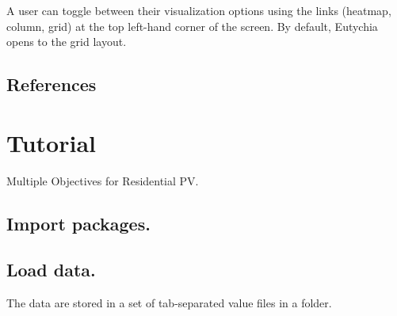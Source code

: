 \documentclass[letterpaper,10pt,english]{sphinxmanual}
\begin{document}
A user can toggle between their visualization options using the links
(heatmap, column, grid) at the top left-hand corner of the screen. By
default, Eutychia opens to the grid layout.


\section{References}
\label{\detokenize{doc-src/user-interface:references}}

\chapter{Tutorial}
\label{\detokenize{doc-src/tutorial:tutorial}}\label{\detokenize{doc-src/tutorial::doc}}
Multiple Objectives for Residential PV.


\section{Import packages.}
\label{\detokenize{doc-src/tutorial:import-packages}}
\begin{sphinxVerbatim}[commandchars=\\\{\}]
 
 
 
\end{sphinxVerbatim}

\begin{sphinxVerbatim}[commandchars=\\\{\}]
               
   
              
             
               

              
   
\end{sphinxVerbatim}


\section{Load data.}
\label{\detokenize{doc-src/tutorial:load-data}}
The data are stored in a set of tab-separated value files in a folder.
\end{document}
